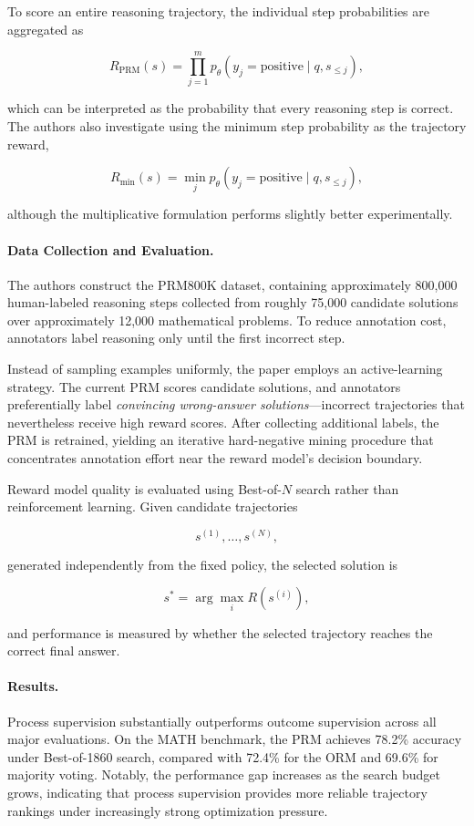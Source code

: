 \documentclass[11pt]{article}
\begin{document}
To score an entire reasoning trajectory, the individual step probabilities are aggregated as

\[
R_{\mathrm{PRM}}(s)
=
\prod_{j=1}^{m}
p_\theta(y_j=\mathrm{positive}\mid q,s_{\le j}),
\]

which can be interpreted as the probability that every reasoning step is correct. The authors also investigate using the minimum step probability as the trajectory reward,

\[
R_{\min}(s)
=
\min_j
p_\theta(y_j=\mathrm{positive}\mid q,s_{\le j}),
\]

although the multiplicative formulation performs slightly better experimentally.

\paragraph{Data Collection and Evaluation.}
The authors construct the PRM800K dataset, containing approximately 800,000 human-labeled reasoning steps collected from roughly 75,000 candidate solutions over approximately 12,000 mathematical problems. To reduce annotation cost, annotators label reasoning only until the first incorrect step.

Instead of sampling examples uniformly, the paper employs an active-learning strategy. The current PRM scores candidate solutions, and annotators preferentially label \emph{convincing wrong-answer solutions}—incorrect trajectories that nevertheless receive high reward scores. After collecting additional labels, the PRM is retrained, yielding an iterative hard-negative mining procedure that concentrates annotation effort near the reward model's decision boundary.

Reward model quality is evaluated using Best-of-\(N\) search rather than reinforcement learning. Given candidate trajectories

\[
s^{(1)},\ldots,s^{(N)},
\]

generated independently from the fixed policy, the selected solution is

\[
s^*
=
\arg\max_i R(s^{(i)}),
\]

and performance is measured by whether the selected trajectory reaches the correct final answer.

\paragraph{Results.}
Process supervision substantially outperforms outcome supervision across all major evaluations. On the MATH benchmark, the PRM achieves 78.2\% accuracy under Best-of-1860 search, compared with 72.4\% for the ORM and 69.6\% for majority voting. Notably, the performance gap increases as the search budget grows, indicating that process supervision provides more reliable trajectory rankings under increasingly strong optimization pressure.
\end{document}
